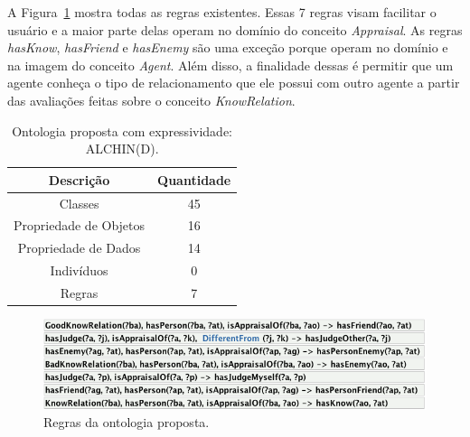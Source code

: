 A Figura~\ref{fig:rlocc} mostra todas as regras existentes. Essas 7 regras
visam facilitar o usuário e a maior parte delas operam no domínio do conceito
\emph{Appraisal}. As regras \emph{hasKnow}, \emph{hasFriend} e \emph{hasEnemy}
são uma exceção porque operam no domínio e na imagem do conceito \emph{Agent}.
Além disso, a finalidade dessas é permitir que um agente conheça o tipo de
relacionamento que ele possui com outro agente a partir das avaliações feitas
sobre o conceito \emph{KnowRelation}.

\begin{table}[h]
	\caption{Ontologia proposta com expressividade: ALCHIN(D).}
	\label{tab:oa:geral}
	\begin{center}
	\begin{tabular}{|c|c|}
		\hline
		Descrição & Quantidade \\ \hline
		Classes &  45 		\\ \hline
		Propriedade de Objetos & 16 \\ \hline
		Propriedade de Dados & 14 \\ \hline
		Indivíduos &  0		\\ \hline
		Regras & 7 \\ \hline
	\end{tabular}
	\end{center}
\end{table}

\begin{figure}
  \centering
  \includegraphics[width=14cm]{figuras/rules-LOCC.png}
  \caption{Regras da ontologia proposta.}
  \label{fig:rlocc}
\end{figure}

